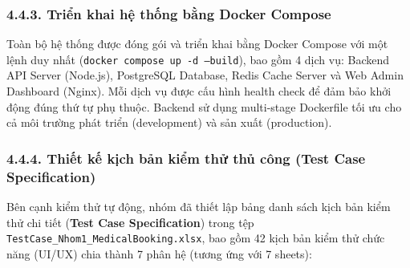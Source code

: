 \documentclass[12pt,a4paper]{report}
\begin{document}
\subsubsection*{4.4.3. Triển khai hệ thống bằng Docker Compose}
\hspace{1em} Toàn bộ hệ thống được đóng gói và triển khai bằng Docker Compose với một lệnh duy nhất (\texttt{docker compose up -d --build}), bao gồm 4 dịch vụ: Backend API Server (Node.js), PostgreSQL Database, Redis Cache Server và Web Admin Dashboard (Nginx). Mỗi dịch vụ được cấu hình health check để đảm bảo khởi động đúng thứ tự phụ thuộc. Backend sử dụng multi-stage Dockerfile tối ưu cho cả môi trường phát triển (development) và sản xuất (production).

\subsubsection*{4.4.4. Thiết kế kịch bản kiểm thử thủ công (Test Case Specification)}
\hspace{1em} Bên cạnh kiểm thử tự động, nhóm đã thiết lập bảng danh sách kịch bản kiểm thử chi tiết (\textbf{Test Case Specification}) trong tệp \texttt{TestCase\_Nhom1\_MedicalBooking.xlsx}, bao gồm 42 kịch bản kiểm thử chức năng (UI/UX) chia thành 7 phân hệ (tương ứng với 7 sheets):
\end{document}
